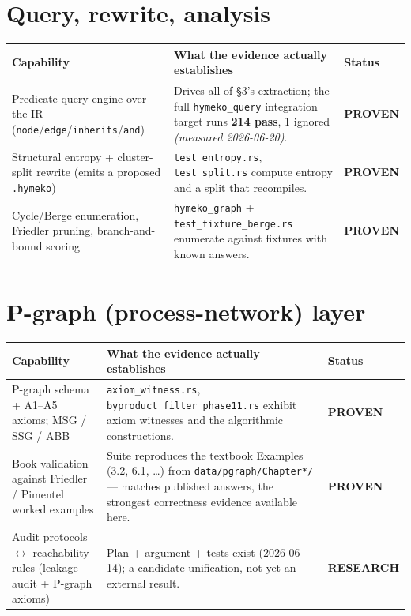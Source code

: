 \documentclass[11pt]{article}
\makeatletter
\newcommand{\sProven}{\textcolor{green!55!black}{\textbf{PROVEN}}}
\newcommand{\sResearch}{\textcolor{orange!80!black}{\textbf{RESEARCH}}}
\newcommand{\code}[1]{\texttt{\small #1}}
\newenvironment{captable}{%
  \begin{longtable}{@{}p{4.9cm}p{8.1cm}>{\raggedright\arraybackslash}p{2.5cm}@{}}
  \toprule
  \textbf{Capability} & \textbf{What the evidence actually establishes} & \textbf{Status}\\
  \midrule\endhead}{%
  \bottomrule\end{longtable}}
\makeatother
\begin{document}
\section{Query, rewrite, analysis}
\begin{captable}
Predicate query engine over the IR (\code{node}/\code{edge}/\code{inherits}/\code{and})
  & Drives all of §3's extraction; the full \code{hymeko\_query} integration target runs
    \textbf{214 pass}, 1 ignored \emph{(measured 2026-06-20)}.
  & \sProven\\
\addlinespace
Structural entropy + cluster-split rewrite (emits a proposed \code{.hymeko})
  & \code{test\_entropy.rs}, \code{test\_split.rs} compute entropy and a split that recompiles.
  & \sProven\\
\addlinespace
Cycle/Berge enumeration, Friedler pruning, branch-and-bound scoring
  & \code{hymeko\_graph} + \code{test\_fixture\_berge.rs} enumerate against fixtures with known
    answers.
  & \sProven\\
\end{captable}

\section{P-graph (process-network) layer}
\begin{captable}
P-graph schema + A1--A5 axioms; MSG / SSG / ABB
  & \code{axiom\_witness.rs}, \code{byproduct\_filter\_phase11.rs} exhibit axiom witnesses and
    the algorithmic constructions.
  & \sProven\\
\addlinespace
Book validation against Friedler / Pimentel worked examples
  & Suite reproduces the textbook Examples (3.2, 6.1, \dots) from \code{data/pgraph/Chapter*/}
    --- matches published answers, the strongest correctness evidence available here.
  & \sProven\\
\addlinespace
Audit protocols $\leftrightarrow$ reachability rules (leakage audit + P-graph axioms)
  & Plan + argument + tests exist (2026-06-14); a candidate unification, not yet an external
    result.
  & \sResearch\\
\end{captable}
\end{document}
